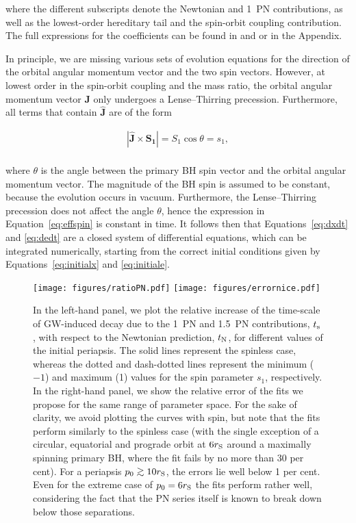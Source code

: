 \documentclass[usenatbib]{mnras}
\def\gsim{\mathrel{\rlap{\lower 3pt \hbox{$\sim$}} \raise 2.0pt \hbox{$>$}}}
\begin{document}
\noindent where the different subscripts denote the Newtonian and 1~PN contributions, as well as the lowest-order hereditary tail and the spin-orbit coupling contribution. The full expressions for the coefficients can be found in \cite{jetzer} and \cite{2019PhRvD.100h4043E} or in the Appendix.

In principle, we are missing various sets of evolution equations for the direction of the orbital angular momentum vector and the two spin vectors. However, at lowest order in the spin-orbit coupling and the mass ratio, the orbital angular momentum vector $\mathbf{J}$ only undergoes a Lense--Thirring \citep[][]{Lense_Thirring_1918} precession. Furthermore, all terms that contain $\mathbf{\hat{J}}$ are of the form

\begin{align}
\left\lvert \mathbf{\hat{J} \times S_1} \right\rvert= S_1 \cos{\theta} =s_1, \label{eq:effspin}\\ \nonumber
\end{align}

\noindent where $\theta$ is the angle between the primary BH spin vector and the orbital angular momentum vector. The magnitude of the BH spin is assumed to be constant, because the evolution occurs in vacuum. Furthermore, the Lense--Thirring precession does not affect the angle $\theta$, hence the expression in Equation~\eqref{eq:effspin} is constant in time. It follows then that Equations~\eqref{eq:dxdt} and \eqref{eq:dedt} are a closed system of differential equations, which can be integrated numerically, starting from the correct initial conditions given by Equations~\eqref{eq:initialx} and \eqref{eq:initiale}.

\begin{figure*}
    \centering
    \texttt{[image: figures/ratioPN.pdf]}
    \texttt{[image: figures/errornice.pdf]}
     \caption{In the left-hand panel, we plot the relative increase of the time-scale of GW-induced decay due to the 1~PN and 1.5~PN contributions, $t_{\rm s}$, with respect to the Newtonian prediction, $t_{\rm N}$, for different values of the initial periapsis. The solid lines represent the spinless case, whereas the dotted and dash-dotted lines represent the minimum ($-1$) and maximum (1) values for the spin parameter $s_1$, respectively. In the right-hand panel, we show the relative error of the fits we propose for the same range of parameter space. For the sake of clarity, we avoid plotting the curves with spin, but note that the fits perform similarly to the spinless case (with the single exception of a circular, equatorial and prograde orbit at $6 r_{\rm S}$ around a maximally spinning primary BH, where the fit fails by no more than 30 per cent). For a periapsis $p_0 \gsim 10 r_{\rm S}$, the errors lie well below 1 per cent. Even for the extreme case of $p_0 = 6 r_{\rm S}$ the fits perform rather well, considering the fact that the PN series itself is known to break down below those separations.}
    \label{fig:ratioPN}
\end{figure*}
\end{document}
